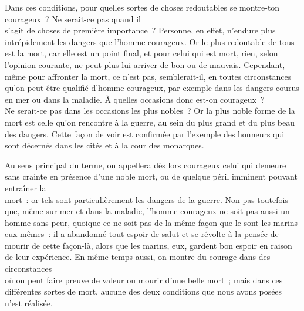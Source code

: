 \documentclass[french,twoside]{book} %
\begin{document}
Dans ces conditions, pour quelles sortes de choses redoutables se montre-ton courageux ? Ne serait-ce pas quand il \\
s’agit de choses de première importance ? Personne, en effet, n’endure plus intrépidement les dangers que l’homme courageux. Or le plus redoutable de tous est la mort, car elle est un point final, et pour celui qui est mort, rien, selon l’opinion courante, ne peut plus lui arriver de bon ou de mauvais. Cependant, même pour affronter la mort, ce n’est pas, semblerait-il, en toutes circonstances qu’on peut être qualifié d’homme courageux, par exemple dans les dangers courus en mer ou dans la maladie. À quelles occasions donc est-on courageux ? \\
Ne serait-ce pas dans les occasions les plus nobles ? Or la plus noble forme de la mort est celle qu’on rencontre à la guerre, au sein du plus grand et du plus beau des dangers. Cette façon de voir est confirmée par l’exemple des honneurs qui sont décernés dans les cités et à la cour des monarques.\par
Au sens principal du terme, on appellera dès lors courageux celui qui demeure sans crainte en présence d’une noble mort, ou de quelque péril imminent pouvant entraîner la \\
mort : or tels sont particulièrement les dangers de la guerre.  Non pas toutefois que, même sur mer et dans la maladie, l’homme courageux ne soit pas aussi un homme sans peur, quoique ce ne soit pas de la même façon que le sont les marins eux-mêmes : il a abandonné tout espoir de salut et se révolte à la pensée de mourir de cette façon-là, alors que les marins, eux, gardent bon espoir en raison de leur expérience. En même temps aussi, on montre du courage dans des circonstances \\
où on peut faire preuve de valeur ou mourir d’une belle mort ; mais dans ces différentes sortes de mort, aucune des deux conditions que nous avons posées n’est réalisée.
\end{document}
